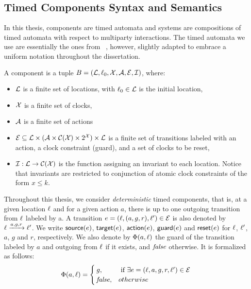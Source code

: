 \subsection{Timed Components Syntax and Semantics}
In this thesis, components are timed automata and systems are compositions of timed automata
with respect to multiparty interactions. The timed automata we use are essentially the ones from
~\cite{AlurD94}, however, slightly adapted to embrace a uniform notation throughout the dissertation.
\begin{definition}\label{def:tc}
  A component is a tuple $B=(\mathcal{L},\ell_0,\mathcal{X},\mathcal{A},\mathcal{E},\mathcal{I})$, where:
  \begin{itemize}
    \item $\mathcal{L}$ is a finite set of locations, with $\ell_0\in\mathcal{L}$ is the 
      initial location,
    \item $\mathcal{X}$ is a finite set of clocks,
    \item $\mathcal{A}$ is a finite set of actions
    \item $\mathcal{E}\subseteq\mathcal{L}\times(\mathcal{A}\times\mathcal{C(X)}\times2^{\mathcal{X}})
      \times\mathcal{L}$ is a finite set of transitions labeled with an action, 
      a clock constraint (guard), and a set of clocks to be reset,
    \item $\mathcal{I}:\mathcal{L}\to\mathcal{C(X)}$ is the function assigning an invariant
      to each location. Notice that invariants are restricted to conjunction
      of atomic clock constraints of the form $x\le k$. 
  \end{itemize}
\end{definition}

Throughout this thesis, we consider 
\emph{deterministic} timed components, that is, at a given location
$\ell$ and for a given action $a$, there is up to one outgoing transition
from $\ell$ labeled by a. 
A transition $e=(\ell,(a,g,r),\ell')\in\mathcal{E}$ is also denoted by
$\ell\xrightarrow{a,g,r}\ell'$. We write $\textsf{source}(e)$, $\textsf{target}(e)$, $\textsf{action}(e)$, $\textsf{guard}(e)$
and $\textsf{reset}(e)$ for $\ell$, $\ell'$, $a$, $g$ and $r$, respectively.
We also denote by $\Phi(a,\ell)$ the guard 
of the transition labeled by $a$ and outgoing from $\ell$
if it exists, and $\textnormal{\textit{false}}$ otherwise. It is formalized as follows:
\[\Phi(a,\ell)=\begin{cases}
  g,& \text{ if } \exists e=(\ell,a,g,r,\ell')\in\mathcal{E}  \\
  \textnormal{\textit{false}},& otherwise
\end{cases}\]

